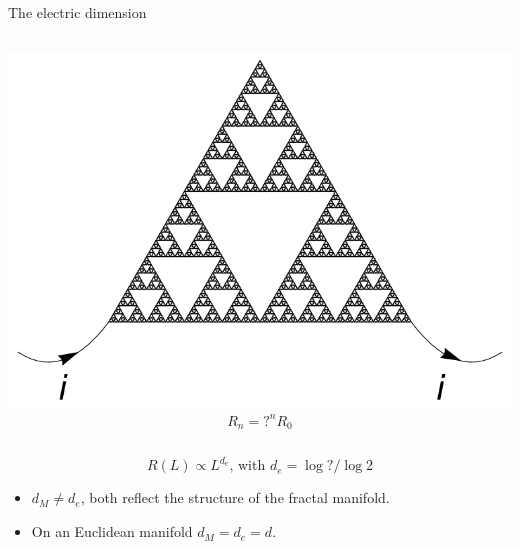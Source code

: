 \documentclass[xcolor=x11names,compress,professionalfonts]{beamer}
\renewcommand{\(}{\begin{columns}}
\renewcommand{\)}{\end{columns}}
\newcommand{\<}[1]{\begin{column}{#1}}
\renewcommand{\>}{\end{column}}
\begin{document}
\begin{frame}{The electric dimension}
\begin{columns}
    \begin{column}{3cm}
    \centering
    \includegraphics[scale=\s]{resInfty.pdf}
    \scriptsize
    \[ R_n= ?^nR_0 \]
  \end{column}
\end{columns}

\[ R(L) \propto L^{d_e} \text{, with } d_e = \log ?/\log 2 \]

\begin{itemize}
	\item $d_M \neq d_e$, both reflect the structure of the fractal manifold.
	\item On an Euclidean manifold $d_M = d_e = d$.
\end{itemize}

\end{frame}
\end{document}
